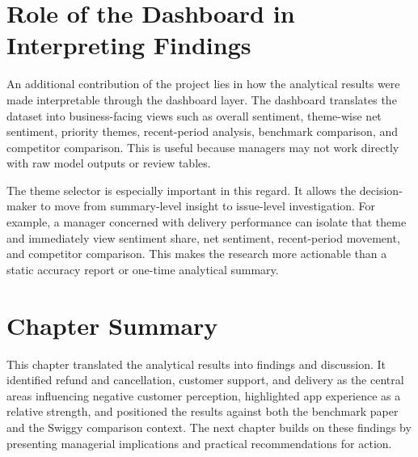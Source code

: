 \section{Role of the Dashboard in Interpreting Findings}

An additional contribution of the project lies in how the analytical results were made interpretable through the dashboard layer. The dashboard translates the dataset into business-facing views such as overall sentiment, theme-wise net sentiment, priority themes, recent-period analysis, benchmark comparison, and competitor comparison. This is useful because managers may not work directly with raw model outputs or review tables.

The theme selector is especially important in this regard. It allows the decision-maker to move from summary-level insight to issue-level investigation. For example, a manager concerned with delivery performance can isolate that theme and immediately view sentiment share, net sentiment, recent-period movement, and competitor comparison. This makes the research more actionable than a static accuracy report or one-time analytical summary.

\section{Chapter Summary}

This chapter translated the analytical results into findings and discussion. It identified refund and cancellation, customer support, and delivery as the central areas influencing negative customer perception, highlighted app experience as a relative strength, and positioned the results against both the benchmark paper and the Swiggy comparison context. The next chapter builds on these findings by presenting managerial implications and practical recommendations for action.
